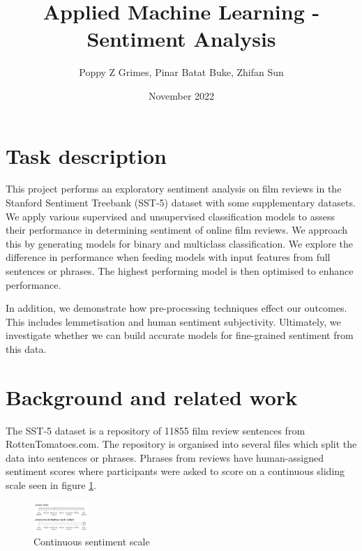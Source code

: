 \documentclass[10pt, a4paper]{article}
\title{Applied Machine Learning - Sentiment Analysis}
\author{Poppy Z Grimes, Pinar Batat Buke, Zhifan Sun}
\date{November 2022}
\begin{document}
\maketitle 

\section{Task description}

This project performs an exploratory sentiment analysis on film reviews in the Stanford Sentiment Treebank (SST-5) dataset with some supplementary datasets. We apply various supervised and unsupervised classification models to assess their performance in determining sentiment of online film reviews. We approach this by generating models for binary and multiclass classification. We explore the difference in performance when feeding models with input features from full sentences or phrases. The highest performing model is then optimised to enhance performance. 

 In addition, we demonstrate how pre-processing techniques effect our outcomes. This includes lemmetisation and human sentiment subjectivity. Ultimately, we investigate whether we can build accurate models for fine-grained sentiment from this data. %



\section{Background and related work}


The SST-5 dataset is a repository of 11855 film review sentences from RottenTomatoes.com. The repository is organised into several files which split the data into sentences or phrases. Phrases from reviews have human-assigned sentiment scores where participants were asked to score on a continuous sliding scale seen in figure \ref{fig:sentiment_scale}.

\begin{figure}
    \begin{center}
        \includegraphics[width=0.189\textwidth]{sentiment_scale} 
    \end{center}
\caption{Continuous sentiment scale}
\label{fig:sentiment_scale}
\end{figure}
\end{document}
